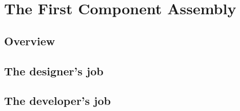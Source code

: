 \chapter{The First Component Assembly}
\begin{flushright}
{\it }
\end{flushright}

\section{Overview}



\section{The designer's job}

\section{The developer's job}
